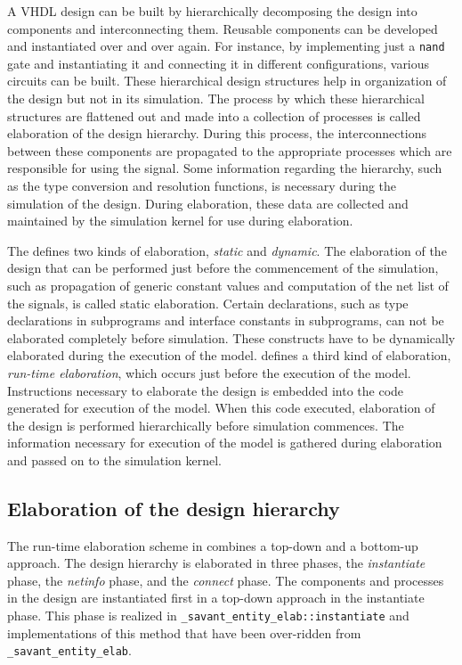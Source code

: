 \documentclass[11pt]{article}
\begin{document}
A VHDL design can be built by hierarchically decomposing the design into
components and interconnecting them.  Reusable components can be developed
and instantiated over and over again.  For instance, by implementing just a
\texttt{nand} gate and instantiating it and connecting it in different
configurations, various circuits can be built.  These hierarchical design
structures help in organization of the design but not in its simulation.
The process by which these hierarchical structures are flattened out and
made into a collection of processes is called elaboration of the design
hierarchy.  During this process, the interconnections between these
components are propagated to the appropriate processes which are
responsible for using the signal.  Some information regarding the
hierarchy, such as the type conversion and resolution functions, is
necessary during the simulation of the design.  During elaboration, these
data are collected and maintained by the simulation kernel for use during
elaboration.

The \LRM\/ defines two kinds of elaboration, \textit{static} and
\textit{dynamic}.  The elaboration of the design that can be performed
just before the commencement of the simulation, such as propagation of
generic constant values and computation of the net list of the signals, is
called static elaboration.  Certain declarations, such as type
declarations in subprograms and interface constants in subprograms, can
not be elaborated completely before simulation.  These constructs have to
be dynamically elaborated during the execution of the model.  \tyvis\/
defines a third kind of elaboration, \textit{run-time elaboration}, which
occurs just before the execution of the model.  Instructions necessary to
elaborate the design is embedded into the code generated for execution of
the model.  When this code executed, elaboration of the design is
performed hierarchically before simulation commences.  The information
necessary for execution of the model is gathered during elaboration and
passed on to the simulation kernel.

\subsection{Elaboration of the design hierarchy}

The run-time elaboration scheme in \tyvis\/ combines a top-down and a
bottom-up approach.  The design hierarchy is elaborated in three phases,
the \textit{instantiate} phase, the \textit{netinfo} phase, and the
\textit{connect} phase.  The components and processes in the design are
instantiated first in a top-down approach in the instantiate phase.  This
phase is realized in \texttt{\_savant\_entity\_elab::instantiate} and
implementations of this method that have been over-ridden from
\texttt{\_savant\_entity\_elab}.
\end{document}
